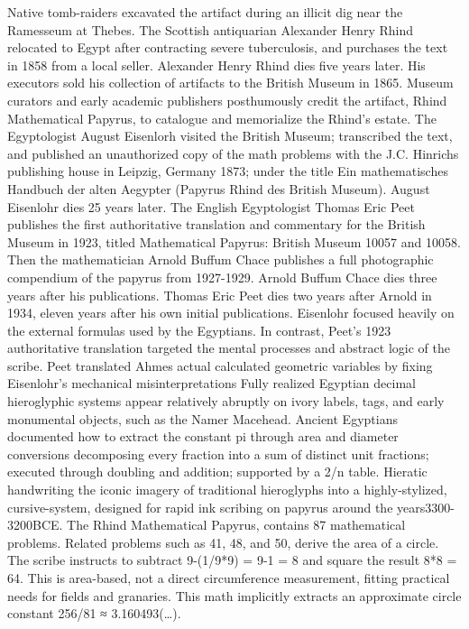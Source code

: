 Native tomb-raiders excavated the artifact during an illicit dig near the Ramesseum at Thebes. The Scottish antiquarian Alexander Henry Rhind relocated to Egypt after contracting severe tuberculosis, and purchases the text in 1858 from a local seller. Alexander Henry Rhind dies five years later. His executors sold his collection of artifacts to the British Museum in 1865. Museum curators and early academic publishers posthumously credit the artifact, Rhind Mathematical Papyrus, to catalogue and memorialize the Rhind’s estate. The Egyptologist August Eisenlorh visited the British Museum; transcribed the text, and published an unauthorized copy of the math problems with the J.C. Hinrichs publishing house in Leipzig, Germany 1873; under the title Ein mathematisches Handbuch der alten Aegypter (Papyrus Rhind des British Museum). August Eisenlohr dies 25 years later. The English Egyptologist Thomas Eric Peet publishes the first authoritative translation and commentary for the British Museum in 1923, titled Mathematical Papyrus: British Museum 10057 and 10058. Then the mathematician Arnold Buffum Chace publishes a full photographic compendium of the papyrus from 1927-1929. Arnold Buffum Chace dies three years after his publications. Thomas Eric Peet dies two years after Arnold in 1934, eleven years after his own initial publications. Eisenlohr focused heavily on the external formulas used by the Egyptians. In contrast, Peet’s 1923 authoritative translation targeted the mental processes and abstract logic of the scribe. Peet translated Ahmes actual calculated geometric variables by fixing Eisenlohr’s mechanical misinterpretations
Fully realized Egyptian decimal hieroglyphic systems appear relatively abruptly on ivory labels, tags, and early monumental objects, such as the Namer Macehead. Ancient Egyptians documented how to extract the constant pi through area and diameter conversions decomposing every fraction into a sum of distinct unit fractions; executed through doubling and addition; supported by a 2/n table. Hieratic handwriting the iconic imagery of traditional hieroglyphs into a highly-stylized, cursive-system, designed for rapid ink scribing on papyrus around the years3300-3200BCE. The Rhind Mathematical Papyrus, contains 87 mathematical problems. Related problems such as 41, 48, and 50, derive the area of a circle. 
The scribe instructs to subtract 9-(1/9*9) = 9-1 = 8 and square the result 8*8 = 64.
This is area-based, not a direct circumference measurement, fitting practical needs for fields and granaries. This math implicitly extracts an approximate circle constant 256/81 ≈ 3.160493(…).
